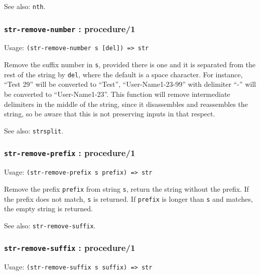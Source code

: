 \documentclass[
]{article}
\newcommand{\passthrough}[1]{#1}
\begin{document}
See also: \passthrough{\lstinline!nth!}.

\hypertarget{str-remove-number-procedure1}{%
\subsubsection{\texorpdfstring{\texttt{str-remove-number} :
procedure/1}{str-remove-number : procedure/1}}\label{str-remove-number-procedure1}}

Usage: \passthrough{\lstinline!(str-remove-number s [del]) => str!}

Remove the suffix number in \passthrough{\lstinline!s!}, provided there
is one and it is separated from the rest of the string by
\passthrough{\lstinline!del!}, where the default is a space character.
For instance, ``Test 29'' will be converted to ``Test'',
``User-Name1-23-99'' with delimiter ``-'' will be converted to
``User-Name1-23''. This function will remove intermediate delimiters in
the middle of the string, since it disassembles and reassembles the
string, so be aware that this is not preserving inputs in that respect.

See also: \passthrough{\lstinline!strsplit!}.

\hypertarget{str-remove-prefix-procedure1}{%
\subsubsection{\texorpdfstring{\texttt{str-remove-prefix} :
procedure/1}{str-remove-prefix : procedure/1}}\label{str-remove-prefix-procedure1}}

Usage: \passthrough{\lstinline!(str-remove-prefix s prefix) => str!}

Remove the prefix \passthrough{\lstinline!prefix!} from string
\passthrough{\lstinline!s!}, return the string without the prefix. If
the prefix does not match, \passthrough{\lstinline!s!} is returned. If
\passthrough{\lstinline!prefix!} is longer than
\passthrough{\lstinline!s!} and matches, the empty string is returned.

See also: \passthrough{\lstinline!str-remove-suffix!}.

\hypertarget{str-remove-suffix-procedure1}{%
\subsubsection{\texorpdfstring{\texttt{str-remove-suffix} :
procedure/1}{str-remove-suffix : procedure/1}}\label{str-remove-suffix-procedure1}}

Usage: \passthrough{\lstinline!(str-remove-suffix s suffix) => str!}
\end{document}
